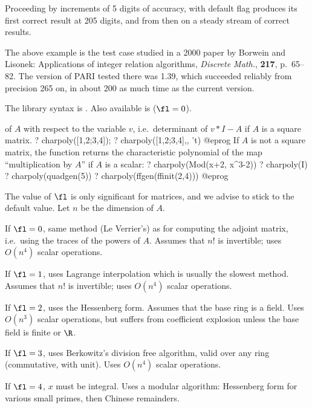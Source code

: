 Proceeding by increments of 5 digits of accuracy,  with default
flag produces its first correct result at 205 digits, and from then on a
steady stream of correct results.

The above example is the test case studied in a 2000 paper by Borwein and
Lisonek: Applications of integer relation algorithms, \emph{Discrete Math.},
{\bf 217}, p.~65--82. The version of PARI tested there was 1.39, which
succeeded reliably from precision 265 on, in about 200 as much time as the
current version.

The library syntax is .
Also available is  ($\fl=0$).

\label{se:charpoly}
of $A$ with respect to the variable $v$, i.e.~determinant of $v*I-A$ if $A$
is a square matrix.
\bprog
? charpoly([1,2;3,4]);
? charpoly([1,2;3,4],, 't)
@eprog\noindent
If $A$ is not a square matrix, the function returns the characteristic
polynomial of the map ``multiplication by $A$'' if $A$ is a scalar:
\bprog
? charpoly(Mod(x+2, x^3-2))
? charpoly(I)
? charpoly(quadgen(5))
? charpoly(ffgen(ffinit(2,4)))
@eprog

The value of $\fl$ is only significant for matrices, and we advise to stick
to the default value. Let $n$ be the dimension of $A$.

If $\fl=0$, same method (Le Verrier's) as for computing the adjoint matrix,
i.e.~using the traces of the powers of $A$. Assumes that $n!$ is
invertible; uses $O(n^4)$ scalar operations.

If $\fl=1$, uses Lagrange interpolation which is usually the slowest method.
Assumes that $n!$ is invertible; uses $O(n^4)$ scalar operations.

If $\fl=2$, uses the Hessenberg form. Assumes that the base ring is a field.
Uses $O(n^3)$ scalar operations, but suffers from coefficient explosion
unless the base field is finite or $\R$.

If $\fl=3$, uses Berkowitz's division free algorithm, valid over any
ring (commutative, with unit). Uses $O(n^4)$ scalar operations.

If $\fl=4$, $x$ must be integral. Uses a modular algorithm: Hessenberg form
for various small primes, then Chinese remainders.


